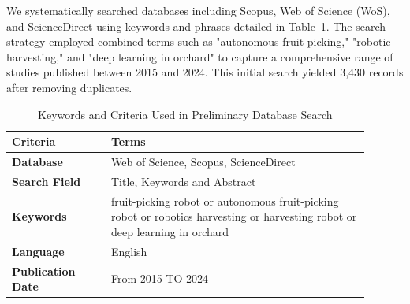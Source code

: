 \documentclass{ieeeaccess}
\begin{document}
We systematically searched databases including Scopus, Web of Science (WoS), and ScienceDirect using keywords and phrases detailed in Table~\ref{tab:keywords}. The search strategy employed combined terms such as "autonomous fruit picking," "robotic harvesting," and "deep learning in orchard" to capture a comprehensive range of studies published between 2015 and 2024. This initial search yielded 3,430 records after removing duplicates.

\begin{table}[htbp]
\centering
\footnotesize
\renewcommand{\arraystretch}{1.2}
\caption{Keywords and Criteria Used in Preliminary Database Search}
\label{tab:keywords}
\renewcommand{\arraystretch}{1.2}
\begin{tabular}{p{0.25\linewidth}p{0.65\linewidth}}
\toprule
\textbf{Criteria} & \textbf{Terms} \\
\midrule
\textbf{Database} & Web of Science, Scopus, ScienceDirect \\
\textbf{Search Field} & Title, Keywords and Abstract \\
\textbf{Keywords} & fruit-picking robot or autonomous fruit-picking robot or robotics harvesting or harvesting robot or deep learning in orchard \\
\textbf{Language} & English \\
\textbf{Publication Date} & From 2015 TO 2024 \\
\bottomrule
\end{tabular}
\end{table}

\end{document}

